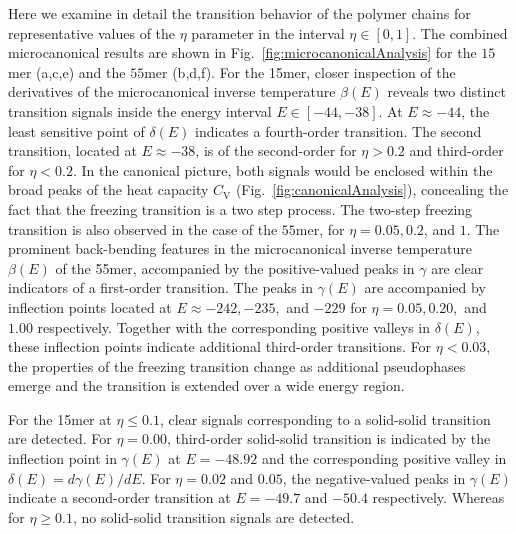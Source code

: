 \documentclass[12pt]{report}
\begin{document}
Here we examine in detail the transition behavior of the polymer chains for representative values of the $\eta$ parameter in the interval $\eta\in[0,1]$. The combined microcanonical results are shown in Fig.~\ref{fig:microcanonicalAnalysis} for the $15$mer (a,c,e) and the $55$mer (b,d,f). For the 15mer, closer inspection of the derivatives of the microcanonical inverse temperature $\beta(E)$ reveals two distinct transition signals inside the energy interval $E\in[-44,-38]$. At $E\approx -44$, the least sensitive point of $\delta(E)$ indicates a fourth-order transition. The second transition, located at $E\approx -38$, is of the second-order for $\eta > 0.2$ and third-order for $\eta < 0.2$. In the canonical picture, both signals would be enclosed within the broad peaks of the heat capacity $C_{\mathrm{V}}$ (Fig.~\ref{fig:canonicalAnalysis}), concealing the fact that the freezing transition is a two step process. The two-step freezing transition is also observed in the case of the $55$mer, for $\eta=0.05, 0.2$, and $1$. The prominent back-bending features in the microcanonical inverse temperature $\beta(E)$ of the 55mer, accompanied by the positive-valued peaks in $\gamma$ are clear indicators of a first-order transition. The peaks in $\gamma(E)$ are accompanied by inflection points located at $E \approx -242, -235,$ and $-229$ for $\eta= 0.05, 0.20,$ and $1.00$ respectively. Together with the corresponding positive valleys in $\delta(E)$, these inflection points indicate additional third-order transitions. For $\eta < 0.03$, the properties of the freezing transition change as additional pseudophases emerge and the transition is extended over a wide energy region. 

For the 15mer at $\eta \leq 0.1$, clear signals corresponding to a solid-solid transition are detected. For $\eta=0.00$, third-order solid-solid transition is indicated by the inflection point in $\gamma(E)$ at $E=-48.92$ and the corresponding positive valley in $\delta(E)=d \gamma(E)/d E$. For $\eta=0.02$ and $0.05$, the negative-valued peaks in $\gamma(E)$ indicate a second-order transition at $E=-49.7$ and $-50.4$ respectively. Whereas for $\eta \geq 0.1$, no solid-solid transition signals are detected.
\end{document}
